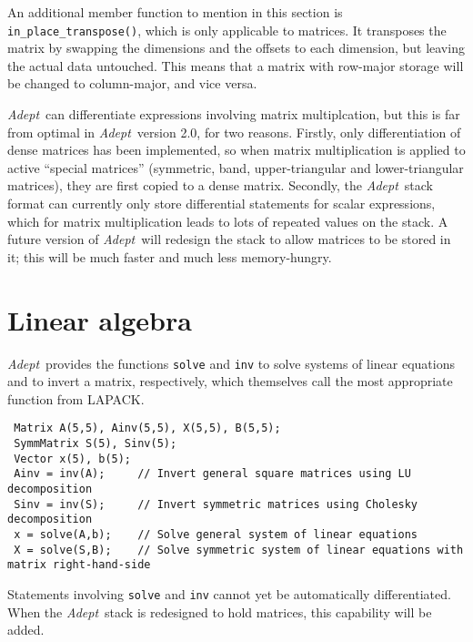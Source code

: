 \documentclass[a4,oneside]{book}
\def\codesize{\small}
\def\Adept{\emph{Adept}}
\def\code#1{{\codesize\texttt{#1}}}
\begin{document}
An additional member function to mention in this section is
\code{in\_place\_transpose()}, which is only applicable to
matrices. It transposes the matrix by swapping the dimensions and the
offsets to each dimension, but leaving the actual data untouched.
This means that a matrix with row-major storage will be changed to
column-major, and vice versa.

\Adept\ can differentiate expressions involving matrix multiplcation,
but this is far from optimal in \Adept\ version 2.0, for two
reasons. Firstly, only differentiation of dense matrices has been
implemented, so when matrix multiplication is applied to active
``special matrices'' (symmetric, band, upper-triangular and
lower-triangular matrices), they are first copied to a dense
matrix. Secondly, the \Adept\ stack format can currently only store
differential statements for scalar expressions, which for matrix
multiplication leads to lots of repeated values on the stack. A future
version of \Adept\ will redesign the stack to allow matrices to be
stored in it; this will be much faster and much less memory-hungry.

\section{Linear algebra}
\label{sec:la}
\Adept\ provides the functions \code{solve} and \code{inv} to solve
systems of linear equations and to invert a matrix, respectively,
which themselves call the most appropriate function from
LAPACK.
\begin{lstlisting}
 Matrix A(5,5), Ainv(5,5), X(5,5), B(5,5);
 SymmMatrix S(5), Sinv(5);
 Vector x(5), b(5);
 Ainv = inv(A);     // Invert general square matrices using LU decomposition
 Sinv = inv(S);     // Invert symmetric matrices using Cholesky decomposition
 x = solve(A,b);    // Solve general system of linear equations
 X = solve(S,B);    // Solve symmetric system of linear equations with matrix right-hand-side
\end{lstlisting}
\iffalse
As for matrix multiplication described in section \ref{sec:matmul}, if
the arguments to \code{solve} and \code{inv} are not matrices with
fastest-varying dimensions that are contiguous and increasing, then
\Adept\ will first convert them to temporary matrices before
performing the operation.
\fi

Statements involving \code{solve} and \code{inv} cannot yet be
automatically differentiated. When the \Adept\ stack is redesigned to
hold matrices, this capability will be added.
\end{document}
